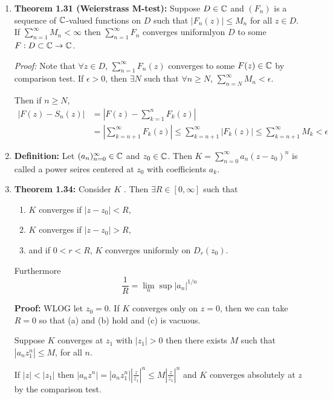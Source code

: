\documentclass[12pt]{article}
\begin{document}
\begin{enumerate}
    \item \textbf{Theorem 1.31 (Weierstrass M-test):} Suppose $D \in \mathbb C$ and $(F_n)$ is a sequence of $\mathbb C$-valued functions on $D$ such that $|F_n(z)| \leq M_n$ for all $z \in D$. If $\sum_{n=1}^\infty M_n < \infty$ then $\sum_{n=1}^\infty F_n$ converges uniformlyon $D$ to some $F: D \subset \mathbb C \to \mathbb C$. 
    
    \textit{Proof:} Note that $\forall z \in D$, $\sum_{n=1}^\infty F_n(z)$ converges to some $F(z) \in \mathbb C$ by comparison test. If $\epsilon > 0$, then $\exists N$ such that $\forall n \geq N$, $\sum_{n=N}^\infty M_n < \epsilon$. 
    
    Then if $n \geq N$, 
    \begin{align*}
        |F(z) - S_n(z)| &= |F(z) - \sum_{k=1}^n F_k (z)| \\ 
        &= \left| \sum_{k= n+1}^\infty F_k(z)\right| \leq  \sum_{k= n+1}^\infty |F_k(z)| \leq  \sum_{k= n+1}^\infty M_k < \epsilon 
    \end{align*}

    \item \textbf{Definition:} Let $(a_n)_{n=0}^\infty \in \mathbb C$ and $z_0 \in \mathbb C$. Then $K = \sum_{n=0}^\infty a_n(z-z_0)^n$ is called a power seires centered at $z_0$ with coefficients $a_k$. 
    
    \item \textbf{Theorem 1.34:} Consider $K$ . Then $\exists R \in [0, \infty]$ such that 
    \begin{enumerate}
        \item $K$ converges if $|z-z_0| < R$, 
        \item $K$ converges if $|z-z_0| > R$, 
        \item and if $ 0 < r < R$, $K$ converges uniformly on $D_r(z_0)$. 
    \end{enumerate}

    Furthermore 
    \[\frac{1}{R} = \lim_n \sup |a_n|^{1/n}\]


    \textbf{Proof:} WLOG let $z_0 =0$. If $K$ converges only on $z = 0$, then we can take $R = 0$ so that (a) and (b) hold and (c) is vacuous. 

    Suppose $K$ converges at $z_1$ with $|z_1| > 0$ then there exists $M$ such that $|a_n z_1^n| \leq M$, for all $n$. 

    If $|z| < |z_1|$ then $|a_nz^n| = |a_nz_1^n| \left|\frac{z}{z_1}\right|^n \leq M \left|\frac{z}{z_1}\right|^n$ and $K$ converges absolutely at $z$ by the comparison test. 


\end{enumerate}
\end{document}
